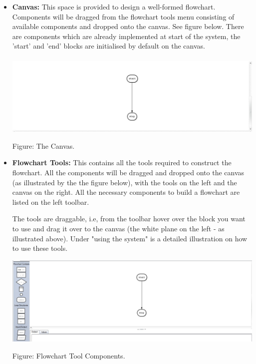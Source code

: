 \documentclass[11pt,a4paper,titlepage]{article}
\begin{document}
		
		\begin{itemize}
			\item \textbf{Canvas:} This space is provided to design a 			well-formed flowchart. Components will be dragged from the flowchart 				tools menu consisting of available components and dropped onto the 				canvas. See figure below.\newline
			There are components which are already implemented at start of the system, the 'start' and 'end' blocks are initialised by default on the canvas.\\ \\
			\includegraphics[width=14cm]{images/Canvas.jpg}
			\begin{center}
		Figure: The Canvas.\newline \newline 
		\end{center}
			
			\item \textbf{Flowchart Tools:} This contains all the tools required to construct the flowchart. All the components will be dragged and dropped onto the canvas (as illustrated by the the figure below), with the tools on the left and the canvas on the right. All the necessary components to build a flowchart are listed on the left toolbar.\newline
			
		The tools are draggable, i.e, from the toolbar hover over the block you want to use and drag it over to the canvas (the white plane on the left - as illustrated above). Under "using the system" is a detailed illustration on how to use these tools. \newline \newline			
			
			\includegraphics[width=14cm]{images/Tools.jpg}
			\begin{center}
		Figure: Flowchart Tool Components.\newline
		\end{center} 
			

\end{itemize}
\end{document}
